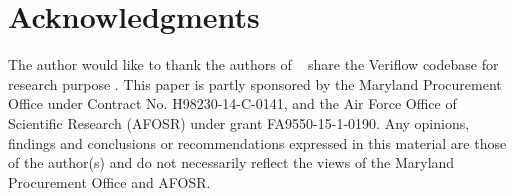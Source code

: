 
\section{Acknowledgments}
The author would like to thank the authors of ~\cite{Veriflow} share the Veriflow codebase
for research purpose .
This paper is partly sponsored by the Maryland Procurement Office under Contract No. H98230-14-C-0141,
and the Air Force Office of Scientific Research (AFOSR) under grant FA9550-15-1-0190.
Any opinions, findings and conclusions or recommendations expressed in this material are
those of the author(s) and do not necessarily reflect the views of
the Maryland Procurement Office and AFOSR.
